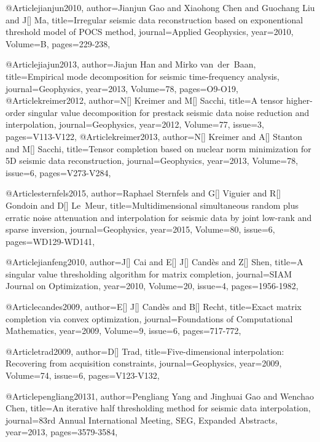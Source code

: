 {@Article{jianjun2010,
  author={Jianjun Gao and Xiaohong Chen and Guochang Liu and J[] Ma},
  title={Irregular seismic data reconstruction based on exponentional threshold model of {POCS} method},
  journal={Applied Geophysics},
  year=2010,
  Volume=B,
  pages={229-238},
}

@Article{jiajun2013,
  author={Jiajun Han and Mirko van~der~Baan},
  title={Empirical mode decomposition for seismic time-frequency analysis},
  journal={Geophysics},
  year=2013,
  Volume=78,
  pages={O9-O19},
}
@Article{kreimer2012,
  author={N[] Kreimer and M[] Sacchi},
  title={A tensor higher-order singular value decomposition for prestack seismic data noise reduction and interpolation},
  journal={Geophysics},
  year=2012,
  Volume=77,
  issue=3,
  pages={V113-V122},
}
@Article{kreimer2013,
  author={N[] Kreimer and A[] Stanton and M[] Sacchi},
  title={Tensor completion based on nuclear norm minimization for 5{D} seismic data reconstruction},
  journal={Geophysics},
  year=2013,
  Volume=78,
  issue=6,
  pages={V273-V284},
}

@Article{sternfels2015,
  author={Raphael Sternfels and G[] Viguier and R[] Gondoin and D[] Le~Meur},
  title={Multidimensional simultaneous random plus erratic noise attenuation and interpolation for seismic data by joint low-rank and sparse inversion},
  journal={Geophysics},
  year=2015,
  Volume=80,
  issue=6,
  pages={WD129-WD141},
}

@Article{jianfeng2010,
  author={J[] Cai and E[] J[] Cand\`{e}s and Z[] Shen},
  title={A singular value thresholding algorithm for matrix completion},
  journal={SIAM Journal on Optimization},
  year=2010,
  Volume=20,
  issue=4,
  pages={1956-1982},
}

@Article{candes2009,
  author={E[] J[] Cand\`{e}s and B[] Recht},
  title={Exact matrix completion via convex optimization},
  journal={Foundations of Computational Mathematics},
  year=2009,
  Volume=9,
  issue=6,
  pages={717-772},
}

@Article{trad2009,
  author={D[] Trad},
  title={Five-dimensional interpolation: Recovering from acquisition constraints},
  journal={Geophysics},
  year=2009,
  Volume=74,
  issue=6,
  pages={V123-V132},
}

@Article{pengliang20131,
  author={Pengliang Yang and Jinghuai Gao and Wenchao Chen},
  title={An iterative half thresholding method for seismic data interpolation},
  journal={83rd Annual International Meeting, SEG, Expanded Abstracts},
  year=2013,
  pages={3579-3584},
}

}

